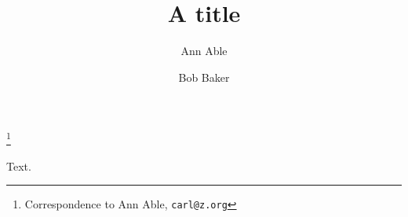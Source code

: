 \documentclass{amsart}
\renewcommand{\email}[1]{\texttt{#1}}
\begin{document}
\title{A title}
\author{Ann Able}
\address{University X, Town}
\author{Bob Baker}
\address{University Y, City}
\thanks{Correspondence to Ann Able, \email{carl@z.org}}
\maketitle
Text.
\end{document}
